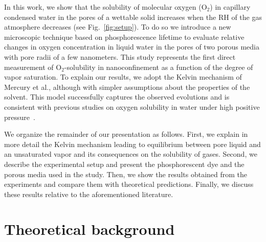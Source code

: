 \documentclass[aps,prl,twocolumn,superscriptaddress,groupedaddress]{revtex4}
\begin{document}
In this work, we show that the solubility of molecular oxygen ($\mathrm{O_2}$) in capillary condensed water in the pores of a wettable solid increases when the $\mathrm{RH}$ of the gas atmosphere decreases (see Fig.~\ref{fig:setup}). To do so we introduce a new microscopic technique based on phosphorescence lifetime to evaluate relative changes in oxygen concentration in liquid water in the pores of two porous media with pore radii of a few nanometers. This study represents the first direct measurement of $\mathrm{O_2}$-solubility in nanoconfinement as a function of the degree of vapor saturation. To explain our results, we adopt the Kelvin mechanism of Mercury et al., although with simpler assumptions about the properties of the solvent. This model successfully captures the observed evolutions and is consistent with previous studies on oxygen solubility in water under high positive pressure~\cite{krichevsky_1935,taylor_1978}.

We organize the remainder of our presentation as follows. First, we explain in more detail the Kelvin mechanism leading to equilibrium between pore liquid and an unsaturated vapor and its consequences on the solubility of gases. Second, we describe the experimental setup and present the phosphorescent dye and the porous media used in the study. Then, we show the results obtained from the experiments and compare them with theoretical predictions. Finally, we discuss these results relative to the aforementioned literature.


\section{Theoretical background}
\end{document}
